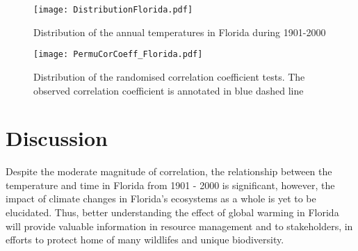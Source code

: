 \documentclass[10pt]{article}
\begin{document}
        \begin{figure}[htbp]
        \centering
        \begin{minipage}{.4\textwidth}
        	\centering
        	\texttt{[image: DistributionFlorida.pdf]}
        	\caption{Distribution of the annual \newline temperatures in Florida during 1901-2000}
        	\label{fig:DistributionFlorida1}
        \end{minipage}%
    	\begin{minipage}{.4\textwidth}
			\centering
    		\texttt{[image: PermuCorCoeff\_Florida.pdf]}
    		\caption{Distribution of the randomised \newline correlation coefficient tests. The observed correlation coefficient is annotated in blue dashed line}
    		\label{fig:PermuCorCoeff_Florida1}
    	\end{minipage}
		\end{figure}\vspace{-1.0em}


    
\section{Discussion\vspace{-0.5em}}
    
    Despite the moderate magnitude of correlation, the relationship between the temperature and time in Florida from 1901 - 2000 is significant, however, the impact of climate changes in Florida's ecosystems as a whole is yet to be elucidated. Thus, better understanding the effect of global warming in Florida will provide valuable information in resource management and to stakeholders, in efforts to protect home of many wildlifes and unique biodiversity. 
    
	

	
\end{document}
